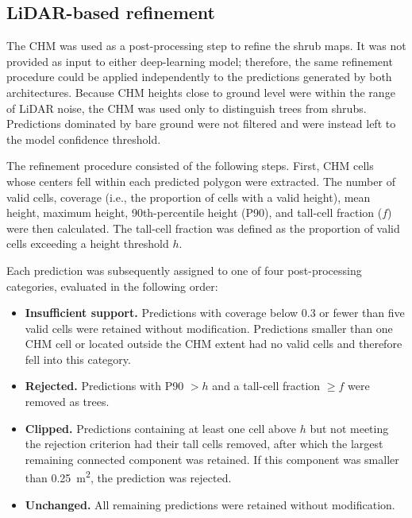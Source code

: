 \documentclass[12pt,a4paper]{article}
\begin{document}
\subsection{LiDAR-based refinement}

The CHM was used as a post-processing step to refine the shrub maps. It was not provided as input to either deep-learning model; therefore, the same refinement procedure could be applied independently to the predictions generated by both architectures. Because CHM heights close to ground level were within the range of LiDAR noise, the CHM was used only to distinguish trees from shrubs. Predictions dominated by bare ground were not filtered and were instead left to the model confidence threshold.

The refinement procedure consisted of the following steps. First, CHM cells whose centers fell within each predicted polygon were extracted. The number of valid cells, coverage (i.e., the proportion of cells with a valid height), mean height, maximum height, 90th-percentile height (P90), and tall-cell fraction ($f$) were then calculated. The tall-cell fraction was defined as the proportion of valid cells exceeding a height threshold $h$.

Each prediction was subsequently assigned to one of four post-processing categories, evaluated in the following order:

\begin{itemize}
\item \textbf{Insufficient support.} Predictions with coverage below 0.3 or fewer than five valid cells were retained without modification. Predictions smaller than one CHM cell or located outside the CHM extent had no valid cells and therefore fell into this category.

\item \textbf{Rejected.} Predictions with P90 $> h$ and a tall-cell fraction $\geq f$ were removed as trees.

\item \textbf{Clipped.} Predictions containing at least one cell above $h$ but not meeting the rejection criterion had their tall cells removed, after which the largest remaining connected component was retained. If this component was smaller than \qty{0.25}{\square\metre}, the prediction was rejected.

\item \textbf{Unchanged.} All remaining predictions were retained without modification.
\end{itemize}
\end{document}
